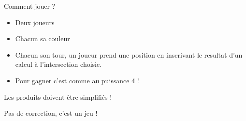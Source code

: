 \numeroteEnigme
\begin{enigme}
    Comment jouer ?
    \begin{itemize}
        \item Deux joueurs
        \item Chacun sa couleur
        \item Chacun son tour, un joueur prend une position en inscrivant le resultat d'un calcul à l'intersection choisie.
        \item Pour gagner c'est comme au puissance 4 !
    \end{itemize}
    \begin{myBox}{  }
        Les produits doivent être simplifiés !
    \end{myBox}

\end{enigme}

\addtocounter{exercice}{-1}
\begin{corrige}
Pas de correction, c'est un jeu !
\end{corrige}